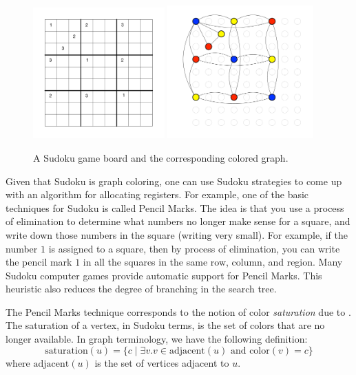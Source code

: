 \documentclass[11pt]{book}
\begin{document}
\begin{figure}[tbp]
\includegraphics[width=0.45\textwidth]{figs/sudoku}
\includegraphics[width=0.5\textwidth]{figs/sudoku-graph}
\caption{A Sudoku game board and the corresponding colored graph.}
\label{fig:sudoku-graph}
\end{figure}


Given that Sudoku is graph coloring, one can use Sudoku strategies to
come up with an algorithm for allocating registers. For example, one
of the basic techniques for Sudoku is called Pencil Marks. The idea is
that you use a process of elimination to determine what numbers no
longer make sense for a square, and write down those numbers in the
square (writing very small). For example, if the number $1$ is
assigned to a square, then by process of elimination, you can write
the pencil mark $1$ in all the squares in the same row, column, and
region. Many Sudoku computer games provide automatic support for
Pencil Marks. This heuristic also reduces the degree of branching in
the search tree.

The Pencil Marks technique corresponds to the notion of color
\emph{saturation} due to \cite{Brelaz:1979eu}.  The saturation of a
vertex, in Sudoku terms, is the set of colors that are no longer
available. In graph terminology, we have the following definition:
\begin{equation*}
  \mathrm{saturation}(u) = \{ c \;|\; \exists v. v \in \mathrm{adjacent}(u)
     \text{ and } \mathrm{color}(v) = c \}
\end{equation*}
where $\mathrm{adjacent}(u)$ is the set of vertices adjacent to $u$.
\end{document}
